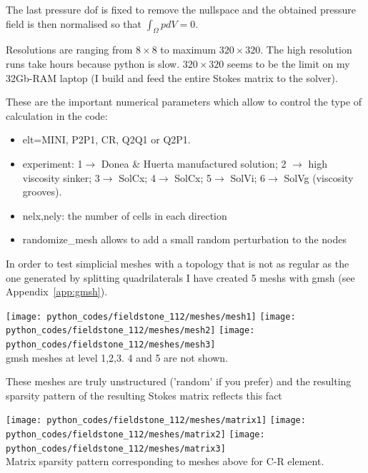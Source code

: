 The last pressure dof is fixed to remove the nullspace and the obtained pressure field
is then normalised so that $\int_\Omega p dV = 0$.

Resolutions are ranging from $8\times 8$ to maximum $320\times320$. The high resolution runs take hours 
because python is slow. $320\times 320$ seems to be the limit on my 32Gb-RAM laptop (I build and feed 
the entire Stokes matrix to the solver).  

These are the important numerical parameters which allow to control the type of calculation in the code:
\begin{itemize}
\item {\python elt}=MINI, P2P1, CR, Q2Q1 or Q2P1.
\item {\python experiment}: 1$\rightarrow$ Donea \& Huerta manufactured solution;
2 $\rightarrow$ high viscosity sinker; 3$\rightarrow$ SolCx; 4$\rightarrow$ SolCx; 
5$\rightarrow$ SolVi; 6$\rightarrow$ SolVg (viscosity grooves).
\item {\python nelx,nely}:  the number of cells in each direction
\item {\python randomize\_mesh} allows to add a small random perturbation to the nodes
\end{itemize}

In order to test simplicial meshes with a topology that is not as regular as the one
generated by splitting quadrilaterals I have created 5 meshs with gmsh (see Appendix~\ref{app:gmsh}).

\begin{center}
\texttt{[image: python\_codes/fieldstone\_112/meshes/mesh1]}
\texttt{[image: python\_codes/fieldstone\_112/meshes/mesh2]}
\texttt{[image: python\_codes/fieldstone\_112/meshes/mesh3]}\\
{\captionfont gmsh meshes at level 1,2,3. 4 and 5 are not shown.}
\end{center}

These meshes are truly unstructured ('random' if you prefer) and 
the resulting sparsity pattern of the resulting Stokes matrix reflects this fact

\begin{center}
\texttt{[image: python\_codes/fieldstone\_112/meshes/matrix1]}
\texttt{[image: python\_codes/fieldstone\_112/meshes/matrix2]}
\texttt{[image: python\_codes/fieldstone\_112/meshes/matrix3]}\\
{\captionfont Matrix sparsity pattern corresponding to meshes above for C-R element.}
\end{center}



